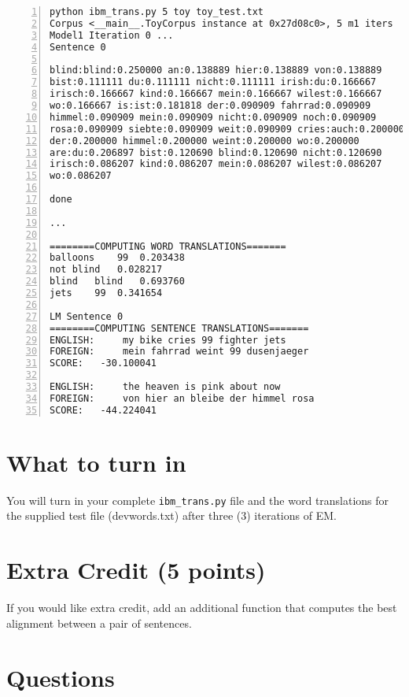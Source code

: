 \documentclass[11pt]{article}
\begin{document}
\begin{lstlisting}[float, label=example,caption=Successful output from running on toy data, frame=trBL,escapechar=*, numbers=left, numberstyle=\tiny, numberblanklines=false]
python ibm_trans.py 5 toy toy_test.txt 
Corpus <__main__.ToyCorpus instance at 0x27d08c0>, 5 m1 iters
Model1 Iteration 0 ...
Sentence 0

blind:blind:0.250000 an:0.138889 hier:0.138889 von:0.138889
bist:0.111111 du:0.111111 nicht:0.111111 irish:du:0.166667
irisch:0.166667 kind:0.166667 mein:0.166667 wilest:0.166667
wo:0.166667 is:ist:0.181818 der:0.090909 fahrrad:0.090909
himmel:0.090909 mein:0.090909 nicht:0.090909 noch:0.090909
rosa:0.090909 siebte:0.090909 weit:0.090909 cries:auch:0.200000
der:0.200000 himmel:0.200000 weint:0.200000 wo:0.200000
are:du:0.206897 bist:0.120690 blind:0.120690 nicht:0.120690
irisch:0.086207 kind:0.086207 mein:0.086207 wilest:0.086207
wo:0.086207

done

...

========COMPUTING WORD TRANSLATIONS=======
balloons	99	0.203438
not	blind	0.028217
blind	blind	0.693760
jets	99	0.341654

LM Sentence 0
========COMPUTING SENTENCE TRANSLATIONS=======
ENGLISH:	 my bike cries 99 fighter jets
FOREIGN:	 mein fahrrad weint 99 dusenjaeger
SCORE:	 -30.100041

ENGLISH:	 the heaven is pink about now
FOREIGN:	 von hier an bleibe der himmel rosa
SCORE:	 -44.224041
\end{lstlisting}

\section*{What to turn in}

You will turn in your complete \texttt{ibm\_trans.py} file and the word translations for the supplied test file (devwords.txt) after three (3) iterations of EM.  

\section*{Extra Credit (5 points)}

If you would like extra credit, add an additional function that computes the best alignment between a pair of sentences. 

\section*{Questions}
\end{document}
